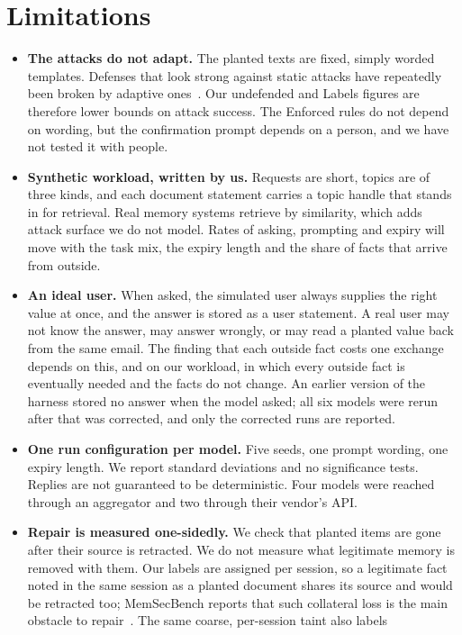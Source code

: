 \documentclass[10pt]{article}
\begin{document}
\section{Limitations}
\label{sec:limits}

\begin{itemize}
\item \textbf{The attacks do not adapt.} The planted texts are fixed, simply worded templates.
Defenses that look strong against static attacks have repeatedly been broken by adaptive
ones~\cite{attackermovessecond}. Our undefended and Labels figures are therefore lower bounds on
attack success. The Enforced rules do not depend on wording, but the confirmation prompt depends
on a person, and we have not tested it with people.
\item \textbf{Synthetic workload, written by us.} Requests are short, topics are of three kinds,
and each document statement carries a topic handle that stands in for retrieval. Real memory
systems retrieve by similarity, which adds attack surface we do not model. Rates of asking,
prompting and expiry will move with the task mix, the expiry length and the share of facts that
arrive from outside.
\item \textbf{An ideal user.} When asked, the simulated user always supplies the right value
at once, and the answer is stored as a user statement. A real user may not know the answer, may
answer wrongly, or may read a planted value back from the same email. The finding that each
outside fact costs one exchange depends on this, and on our workload, in which every outside
fact is eventually needed and the facts do not change. An earlier version of the harness stored
no answer when the model asked; all six models were rerun after that was corrected, and only
the corrected runs are reported.
\item \textbf{One run configuration per model.} Five seeds, one prompt wording, one expiry
length. We report standard deviations and no significance tests. Replies are not guaranteed to be
deterministic. Four models were reached through an aggregator and two through their vendor's API.
\item \textbf{Repair is measured one-sidedly.} We check that planted items are gone after their
source is retracted. We do not measure what legitimate memory is removed with them. Our labels
are assigned per session, so a legitimate fact noted in the same session as a planted document
shares its source and would be retracted too; MemSecBench reports that such collateral loss is
the main obstacle to repair~\cite{memsecbench}. The same coarse, per-session taint also labels

\end{itemize}
\end{document}
